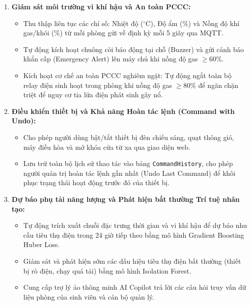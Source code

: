 \begin{enumerate}
    \item \textbf{Giám sát môi trường vi khí hậu và An toàn PCCC:}
    \begin{itemize}
        \item Thu thập liên tục các chỉ số: Nhiệt độ ($^\circ\text{C}$), Độ ẩm ($\%$) và Nồng độ khí gas/khói ($\%$) từ mỗi phòng gửi về định kỳ mỗi 5 giây qua MQTT.
        \item Tự động kích hoạt chuông còi báo động tại chỗ (Buzzer) và gửi cảnh báo khẩn cấp (Emergency Alert) lên máy chủ khi nồng độ gas $\ge 60\%$.
        \item Kích hoạt cơ chế an toàn PCCC nghiêm ngặt: Tự động ngắt toàn bộ relay điện sinh hoạt trong phòng khi nồng độ gas $\ge 80\%$ để ngăn chặn triệt để nguy cơ tia lửa điện phát sinh gây nổ.
    \end{itemize}

    \item \textbf{Điều khiển thiết bị và Khả năng Hoàn tác lệnh (Command with Undo):}
    \begin{itemize}
        \item Cho phép người dùng bật/tắt thiết bị đèn chiếu sáng, quạt thông gió, máy điều hòa và mở khóa cửa từ xa qua giao diện web.
        \item Lưu trữ toàn bộ lịch sử thao tác vào bảng \texttt{CommandHistory}, cho phép người quản trị hoàn tác lệnh gần nhất (Undo Last Command) để khôi phục trạng thái hoạt động trước đó của thiết bị.
    \end{itemize}

    \item \textbf{Dự báo phụ tải năng lượng và Phát hiện bất thường Trí tuệ nhân tạo:}
    \begin{itemize}
        \item Tự động trích xuất chuỗi đặc trưng thời gian và vi khí hậu để dự báo nhu cầu tiêu thụ điện trong 24 giờ tiếp theo bằng mô hình Gradient Boosting Huber Loss.
        \item Giám sát và phát hiện sớm các dấu hiệu tiêu thụ điện bất thường (thiết bị rò điện, chạy quá tải) bằng mô hình Isolation Forest.
        \item Cung cấp trợ lý ảo thông minh AI Copilot trả lời các câu hỏi truy vấn dữ liệu phòng của sinh viên và cán bộ quản lý.
    \end{itemize}
\end{enumerate}

